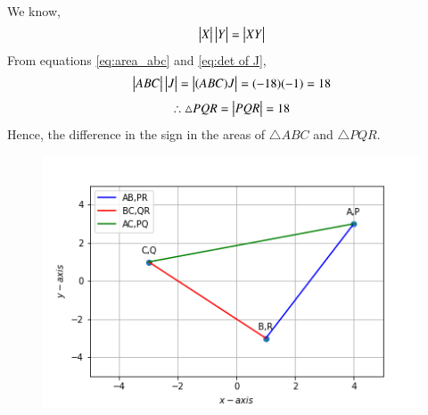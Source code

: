 \documentclass[journal,12pt,twocolumn]{IEEEtran}
\renewcommand\thesection{\arabic{section}}
\begin{document}
\begin{enumerate}[label=\thesection.\arabic*.,ref=\thesection.\theenumi]
\begin{align}
\end{align}
We know,\begin{equation}\label{eq:det_prop}
\begin{vmatrix}X\end{vmatrix}\begin{vmatrix}Y\end{vmatrix}=\begin{vmatrix}XY\end{vmatrix}
\end{equation}
From equations \eqref{eq:area_abc} and \eqref{eq:det of J},
\begin{equation}
\begin{vmatrix}ABC\end{vmatrix}\begin{vmatrix}J\end{vmatrix}=\begin{vmatrix}(ABC)J\end{vmatrix}=(-18)(-1)=18
\end{equation}
\begin{align}\label{eq:area_pqr}
\therefore\triangle PQR=\begin{vmatrix}PQR\end{vmatrix}=18
\end{align}
Hence, the difference in the sign in the areas of $\triangle ABC$ and $\triangle PQR$.
\begin{figure}[!ht]
	\centering
	\includegraphics[scale=0.6]{triangle.png}
\end{figure}
\end{enumerate}
\end{document}
